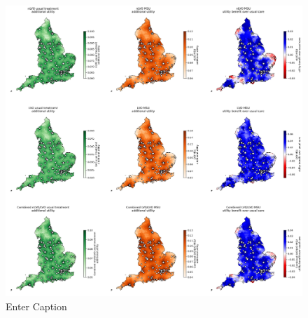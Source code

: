 \begin{figure}
    \centering
    \includegraphics[width=1\linewidth]{images/map_utility.jpg}
    \caption{Enter Caption}
    \label{fig:enter-label}
\end{figure}

